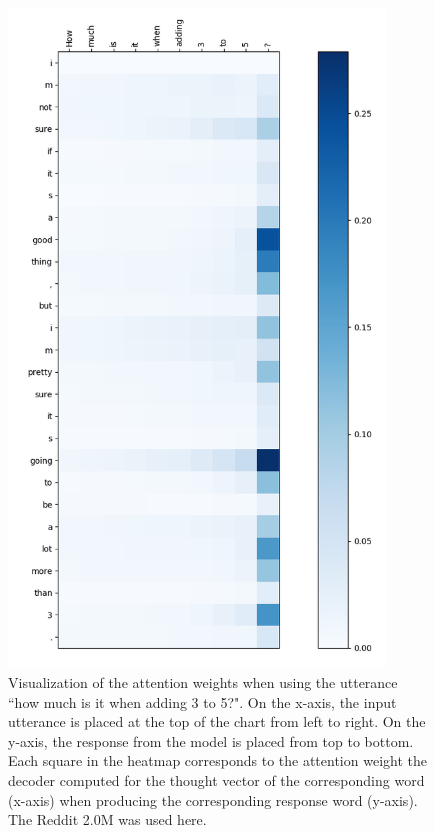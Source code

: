 \begin{figure}[H]
	\centering
	\includegraphics[width=10cm]{img/attention/attention_visualization2_reddit_2m.png}
	\caption{Visualization of the attention weights when using the utterance ``how much is it when adding 3 to 5?". On the x-axis, the input utterance is placed at the top of the chart from left to right. On the y-axis, the response from the model is placed from top to bottom. Each square in the heatmap corresponds to the attention weight the decoder computed for the thought vector of the corresponding word (x-axis) when producing the corresponding response word (y-axis). The Reddit 2.0M was used here.}
	\label{results:attention:example2:reddit}
\end{figure}

